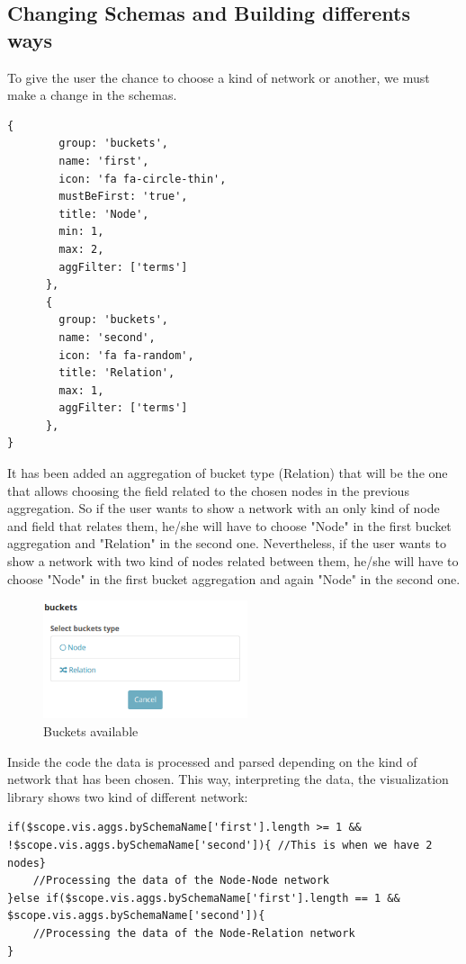 \documentclass[a4paper, 12pt]{book}
\begin{document}
\subsection{Changing Schemas and Building differents ways}

To give the user the chance to choose a kind of network or another, we must make a change in the schemas.

\begin{lstlisting}[frame=single]
{
        group: 'buckets',
        name: 'first',
        icon: 'fa fa-circle-thin',
        mustBeFirst: 'true',
        title: 'Node',
        min: 1,
        max: 2,
        aggFilter: ['terms']
      },
      {
        group: 'buckets',
        name: 'second',
        icon: 'fa fa-random',
        title: 'Relation',
        max: 1,
        aggFilter: ['terms']
      },
}
\end{lstlisting}

It has been added an aggregation of bucket type (Relation) that will be the one that allows choosing the field related to the chosen nodes in the previous aggregation. So if the user wants to show a network with an only kind of node and field that relates them, he/she will have to choose "Node" in the first bucket aggregation and "Relation" in the second one. Nevertheless, if the user wants to show a network with two kind of nodes related between them, he/she will have to choose "Node" in the first bucket aggregation and again "Node" in the second one.
 
\begin{figure}[H]
  \centering
  \includegraphics[width=6cm, keepaspectratio]{img/development/noderelation}
  \caption{Buckets available}
  \label{fig:noderelationbuckets}
\end{figure}

Inside the code the data is processed and parsed depending on the kind of network that has been chosen. This way, interpreting the data, the visualization library shows two kind of different network:

\begin{lstlisting}[frame=single]
if($scope.vis.aggs.bySchemaName['first'].length >= 1 && !$scope.vis.aggs.bySchemaName['second']){ //This is when we have 2 nodes}
	//Processing the data of the Node-Node network
}else if($scope.vis.aggs.bySchemaName['first'].length == 1 && $scope.vis.aggs.bySchemaName['second']){
	//Processing the data of the Node-Relation network
}
\end{lstlisting}
\end{document}
